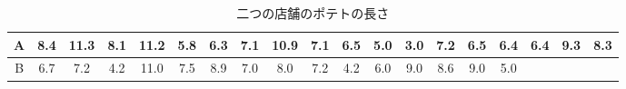 \begin{table}[ht]
	\center
	\caption{二つの店舗のポテトの長さ}
	\begin{tabular}{c|cccccccccccccccccc}\hline
		A & 8.4 & 11.3 & 8.1 & 11.2 & 5.8 & 6.3 & 7.1 & 10.9 & 7.1 & 6.5 & 5.0 & 3.0 & 7.2 & 6.5 & 6.4 & 6.4 & 9.3 & 8.3 \\\hline
		B & 6.7 & 7.2  & 4.2 & 11.0 & 7.5 & 8.9 & 7.0 & 8.0  & 7.2 & 4.2 & 6.0 & 9.0 & 8.6 & 9.0 & 5.0 &     &     &     \\\hline
	\end{tabular}
	\label{tab::20_01}
\end{table}
